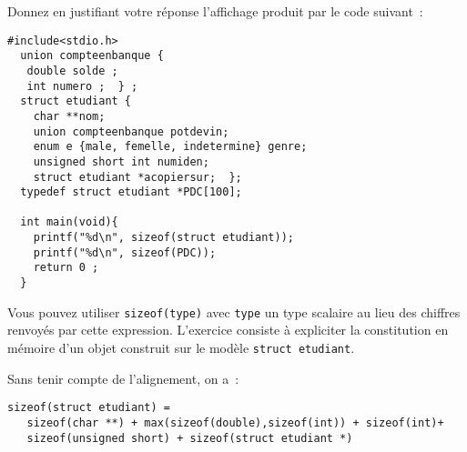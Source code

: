  Donnez en justifiant votre r\'eponse l'affichage produit par le code suivant~:
\begin{verbatim}
#include<stdio.h>
  union compteenbanque {
   double solde ;
   int numero ;  } ;
  struct etudiant {
    char **nom;
    union compteenbanque potdevin;
    enum e {male, femelle, indetermine} genre;
    unsigned short int numiden;
    struct etudiant *acopiersur;  };                                                  
  typedef struct etudiant *PDC[100];

  int main(void){
    printf("%d\n", sizeof(struct etudiant));
    printf("%d\n", sizeof(PDC));
    return 0 ;
  }
\end{verbatim}
Vous pouvez utiliser \verb+sizeof(type)+ avec \verb+type+ un type
scalaire au lieu des chiffres renvoy\'es par cette expression.
L'exercice consiste \`a expliciter la constitution en m\'emoire d'un objet construit sur le mod\`ele \verb+struct etudiant+.
\ifcorrection
\par
Sans tenir compte de l'alignement, on a~:
\begin{verbatim}
sizeof(struct etudiant) =
   sizeof(char **) + max(sizeof(double),sizeof(int)) + sizeof(int)+
   sizeof(unsigned short) + sizeof(struct etudiant *)
\end{verbatim}
\fi
